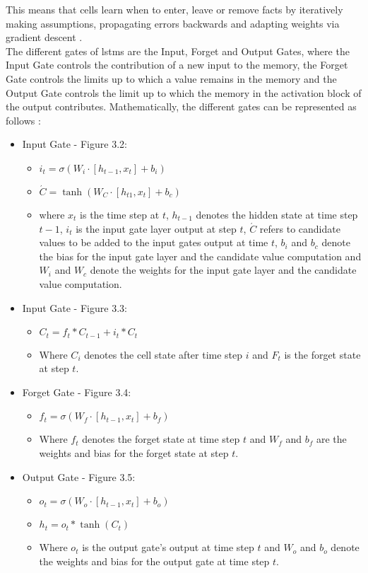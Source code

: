 \documentclass[a4paper, 11pt,titlepage,oneside,openany]{book}
\begin{document}
\newpage 
\noindent This means that cells learn when to enter, leave or remove facts by iteratively making assumptions, propagating errors backwards and adapting weights via gradient descent \cite{lstm}.\\
\indent The different gates of \gls{lstm}s are the Input, Forget and Output Gates, where the Input Gate controls the contribution of a new input to the memory, the Forget Gate controls the limits up to which a value remains in the memory and the Output Gate controls the limit up to which the memory in the activation block of the output contributes. Mathematically, the different gates can be represented as follows \cite{rnn}: 
\begin{itemize}
	\item Input Gate - Figure 3.2: 
	\begin{itemize}
		\item $i_t=\sigma(W_i \cdot [h_{t-1}, x_t]+b_i)$
		\item $\acute{C}=\tanh(W_C \cdot [h_{t1}, x_t]+b_c)$
		\item where $x_t$ is the time step at $t$, $h_{t-1}$ denotes the hidden state at time step $t-1$, $i_t$ is the input gate layer output at step $t$, $\acute{C}$ refers to candidate values to be added to the input gates output at time $t$, $b_i$ and $b_c$ denote the bias for the input gate layer and the candidate value computation and $W_i$ and $W_c$ denote the weights for the input gate layer and the candidate value computation.
	\end{itemize}	
	\item  Input Gate - Figure 3.3:
	\begin{itemize}
		\item $C_t=f_t*C_{t-1}+i_t*C_t$
		\item Where $C_i$ denotes the cell state after time step $i$ and $F_t$ is the forget state at step $t$.
	\end{itemize}
	\newpage
	\item Forget Gate - Figure 3.4:
	\begin{itemize}
		\item $f_t=\sigma(W_f \cdot [h_{t-1}, x_t]+b_f)$
		\item Where $f_t$ denotes the forget state at time step $t$ and $W_f$ and $b_f$ are the weights and bias for the forget state at step $t$.
	\end{itemize}
	\item Output Gate - Figure 3.5:
	\begin{itemize}
		\item $o_t=\sigma(W_o \cdot [h_{t-1},x_t]+b_o)$
		\item $h_t=o_t*\tanh(C_t)$
		\item Where $o_t$ is the output gate's output at time step $t$ and $W_o$ and $b_o$ denote the weights and bias for the output gate at time step $t$.
	\end{itemize}
\end{itemize}
\end{document}
